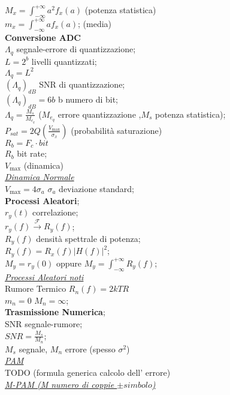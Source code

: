 \documentclass[a4paper]{article}
\begin{document}
\begin{multicols*}{3}
$M_x=\int_{-\infty}^{+\infty} a^2 f_x(a)$ (potenza statistica)\\
$m_x=\int_{-\infty}^{+\infty} a f_x(a)$; (media)\\
\textbf{Conversione ADC} \\
$\Lambda_q$ segnale-errore di quantizzazione; \\
$L=2^b$ livelli quantizzati; \\
$\Lambda_q = L^2$ \\
${(\Lambda_q)}_{dB}$ SNR di quantizzazione; \\
${(\Lambda_q)}_{dB} = 6b$ b numero di bit; \\
${\Lambda}_q=\frac{M_s}{M_{e_q}}$ ($M_{e_q}$ errore quantizzazione 
,$M_s$ potenza statistica); \\
$P_{sat}=2Q(\frac{V_{\max}}{\sigma_x})$ (probabilità saturazione) \\
$R_b=F_c \cdot bit$ \\
$R_b$ bit rate; \\
$V_{\max}$ (dinamica) \\
\underline{\textit{Dinamica Normale}} \\
$V_{\max} = 4\sigma_a$ $\sigma_a$ deviazione standard;\\ 
\textbf{Processi Aleatori}; \\
$r_y(t)$ correlazione; \\
$r_y(f) \xrightarrow{\mathscr{F}} R_y(f)$; \\ 
$R_y(f)$ densità spettrale di potenza; \\
$R_y(f) = R_x(f) |H(f)|^2$; \\
$M_y = r_y(0)$ oppure 
$M_y = \int_{-\infty}^{+\infty} R_y(f)$;\\
\underline{\textit{Processi Aleatori noti}} \\
Rumore Termico $R_n(f)=2kTR$ \\
$m_n=0$ $M_n=\infty$; \\
\textbf{Trasmissione Numerica}; \\
SNR segnale-rumore; \\
$SNR=\frac{M_s}{M_n}$; \\ $M_s$ segnale, $M_n$ errore (spesso $\sigma^2$) \\ 
\underline{\textit{PAM}} \\
TODO (formula generica calcolo dell' errore) \\
\underline{\textit{M-PAM (M numero di coppie $\pm simbolo$) }} \\

\end{multicols*}
\end{document}
